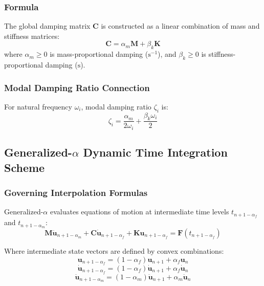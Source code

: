 \subsubsection{Formula}
The global damping matrix $\mathbf{C}$ is constructed as a linear combination of mass and stiffness matrices:
\begin{equation}
\mathbf{C} = \alpha_m \mathbf{M} + \beta_k \mathbf{K}
\end{equation}
where $\alpha_m \ge 0$ is mass-proportional damping ($\text{s}^{-1}$), and $\beta_k \ge 0$ is stiffness-proportional damping ($\text{s}$).

\subsubsection{Modal Damping Ratio Connection}
For natural frequency $\omega_i$, modal damping ratio $\zeta_i$ is:
\begin{equation}
\zeta_i = \frac{\alpha_m}{2 \omega_i} + \frac{\beta_k \omega_i}{2}
\end{equation}

\hr

\subsection{Generalized-$\alpha$ Dynamic Time Integration Scheme}

\subsubsection{Governing Interpolation Formulas}
Generalized-$\alpha$ evaluates equations of motion at intermediate time levels $t_{n+1-\alpha_f}$ and $t_{n+1-\alpha_m}$:
\begin{equation}
\mathbf{M} \ddot{\mathbf{u}}_{n+1-\alpha_m} + \mathbf{C} \dot{\mathbf{u}}_{n+1-\alpha_f} + \mathbf{K} \mathbf{u}_{n+1-\alpha_f} = \mathbf{F}(t_{n+1-\alpha_f})
\end{equation}

Where intermediate state vectors are defined by convex combinations:
\begin{equation}
\mathbf{u}_{n+1-\alpha_f} = (1 - \alpha_f) \mathbf{u}_{n+1} + \alpha_f \mathbf{u}_n
\end{equation}
\begin{equation}
\dot{\mathbf{u}}_{n+1-\alpha_f} = (1 - \alpha_f) \dot{\mathbf{u}}_{n+1} + \alpha_f \dot{\mathbf{u}}_n
\end{equation}
\begin{equation}
\ddot{\mathbf{u}}_{n+1-\alpha_m} = (1 - \alpha_m) \ddot{\mathbf{u}}_{n+1} + \alpha_m \ddot{\mathbf{u}}_n
\end{equation}

